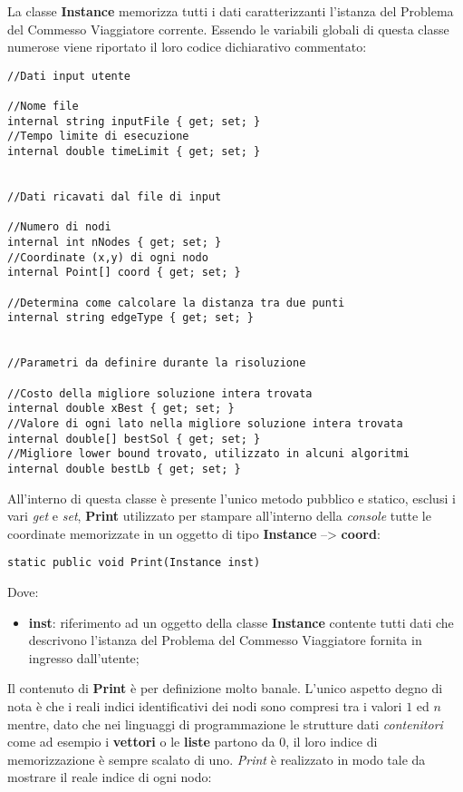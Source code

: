 \documentclass[11pt]{article}
\begin{document}
La classe \textbf{Instance} memorizza tutti i dati caratterizzanti l'istanza del Problema del Commesso Viaggiatore corrente. Essendo le variabili globali di questa classe numerose viene riportato il loro codice dichiarativo commentato:

\begin{lstlisting}
//Dati input utente

//Nome file
internal string inputFile { get; set; }
//Tempo limite di esecuzione
internal double timeLimit { get; set; }


//Dati ricavati dal file di input

//Numero di nodi
internal int nNodes { get; set; }
//Coordinate (x,y) di ogni nodo
internal Point[] coord { get; set; }

//Determina come calcolare la distanza tra due punti
internal string edgeType { get; set; }


//Parametri da definire durante la risoluzione

//Costo della migliore soluzione intera trovata
internal double xBest { get; set; }
//Valore di ogni lato nella migliore soluzione intera trovata
internal double[] bestSol { get; set; }
//Migliore lower bound trovato, utilizzato in alcuni algoritmi
internal double bestLb { get; set; }
\end{lstlisting}

All'interno di questa classe è presente l'unico metodo pubblico e statico, esclusi i vari \textit{get} e \textit{set}, \textbf{Print} utilizzato per stampare all'interno della \textit{console} tutte le coordinate memorizzate in un oggetto di tipo \textbf{Instance} --> \textbf{coord}:

\begin{lstlisting}
static public void Print(Instance inst)
\end{lstlisting}

Dove:

\begin{itemize}
\item \textbf{inst}: riferimento ad un oggetto della classe \textbf{Instance} contente tutti dati che descrivono l'istanza del Problema del Commesso Viaggiatore fornita in ingresso dall'utente;
\end{itemize}

Il contenuto di \textbf{Print} è per definizione molto banale. L'unico aspetto degno di nota è che i reali indici identificativi dei nodi sono compresi tra i valori $1$ ed $n$ mentre, dato che nei linguaggi di programmazione le strutture dati \textit{contenitori} come ad esempio i \textbf{vettori} o le \textbf{liste} partono da $0$, il loro indice di memorizzazione è sempre scalato di uno. \textit{Print} è realizzato in modo tale da mostrare il reale indice di ogni nodo:
\end{document}
